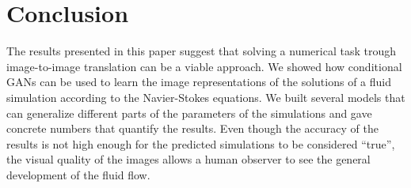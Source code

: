 \documentclass{llncs}
\begin{document}
\section{Conclusion}\label{conclusion}
The results presented in this paper suggest that solving a numerical task trough image-to-image translation can be a viable approach. We showed how conditional GANs can be used to learn the image representations of the solutions of a fluid simulation according to the Navier-Stokes equations. We built several models that can generalize different parts of the parameters of the simulations and gave concrete numbers that quantify the results. Even though the accuracy of the results is not high enough for the predicted simulations to be considered ``true'', the visual quality of the images allows a human observer to see the general development of the fluid flow.
\end{document}
